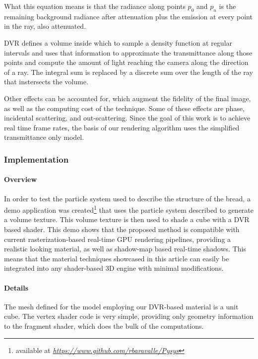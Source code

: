 \documentclass[oneside,a4paper,english,links]{amca}
\begin{document}
What this equation means is that the radiance along points $p_0$ and
$p_n$ is the remaining background radiance after attenuation plus the
emission at every point in the ray, also attenuated.

DVR defines a volume inside which to sample a density function at
regular intervals and uses that information to approximate the
transmittance along those points and compute the amount of light
reaching the camera along the direction of a ray. The integral sum is
replaced by a discrete sum over the length of the ray that instersects
the volume.

Other effects can be accounted for, which augment the fidelity of the
final image, as well as the computing cost of the technique. Some of
these effects are phase, incidental scattering, and
out-scattering. Since the goal of this work is to achieve real time
frame rates, the basis of our rendering algorithm uses the simplified
transmittance only model.

\subsubsection{Implementation}

\paragraph{Overview}

In order to test the particle system used to describe the structure of
the bread, a demo application was created\footnote{available at
  \emph{\url{https://www.github.com/rbaravalle/Pysys}}} that uses the particle
system described to generate a volume texture. This volume texture is
then used to shade a cube with a DVR based shader. This demo shows
that the proposed method is compatible with current
rasterization-based real-time GPU rendering pipelines, providing a
realistic looking material, as well as shadow-map based real-time
shadows. This means that the material techniques showcased in this
article  can easily be integrated into any shader-based 3D engine with
minimal modifications.

\paragraph{Details}

The mesh defined for the model employing our DVR-based material is a unit
cube. The vertex shader code is very simple, providing only geometry
information to the fragment shader, which does the bulk of the
computations. 
\end{document}
